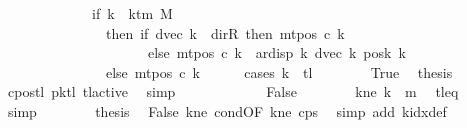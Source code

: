 \begin{isabellebody}
\ \ \ \ \ \ \ \ \ \ \ \ {\isacharequal}{\kern0pt}\ {\isacharparenleft}{\kern0pt}if\ k\ {\isacharless}{\kern0pt}\ k{\isacharunderscore}{\kern0pt}tm\ M\isanewline
\ \ \ \ \ \ \ \ \ \ \ \ \ \ \ then\ {\isacharparenleft}{\kern0pt}if\ dvec\ k\ {\isacharequal}{\kern0pt}\ dir{\isachardot}{\kern0pt}R\ then\ mt{\isacharunderscore}{\kern0pt}pos\ c{}\ k\isanewline
\ \ \ \ \ \ \ \ \ \ \ \ \ \ \ \ \ \ \ \ \ else\ mt{\isacharunderscore}{\kern0pt}pos\ c{}\ k\ {\isacharminus}{\kern0pt}\ ar{\isacharunderscore}{\kern0pt}disp\ {\isacharquery}{\kern0pt}k\ {\isacharparenleft}{\kern0pt}dvec\ k{\isacharparenright}{\kern0pt}\ {\isacharparenleft}{\kern0pt}posk{}\ k{\isacharparenright}{\kern0pt}{\isacharparenright}{\kern0pt}\isanewline
\ \ \ \ \ \ \ \ \ \ \ \ \ \ \ else\ mt{\isacharunderscore}{\kern0pt}pos\ c{}\ k{\isacharparenright}{\kern0pt}{\isachardoublequoteclose}\isanewline
\ \ \ \ \isamarkupfalse%
\ {\isacharparenleft}{\kern0pt}cases\ {\isachardoublequoteopen}k\ {\isacharequal}{\kern0pt}\ {\isacharquery}{\kern0pt}tl{\isachardoublequoteclose}{\isacharparenright}{\kern0pt}\isanewline
\ \ \ \ \ \ \isamarkupfalse%
\ True\ \isamarkupfalse%
\ {\isacharquery}{\kern0pt}thesis\ \isamarkupfalse%
\ c{}{\isacharunderscore}{\kern0pt}pos{\isacharunderscore}{\kern0pt}tl\ pk{\isacharunderscore}{\kern0pt}tl\ tl{\isacharunderscore}{\kern0pt}active\ \isamarkupfalse%
\ simp\isanewline
\ \ \ \ \isamarkupfalse%
\isanewline
\ \ \ \ \ \ \isamarkupfalse%
\ False\isanewline
\ \ \ \ \ \ \isamarkupfalse%
\ kne{\isacharcolon}{\kern0pt}\ {\isachardoublequoteopen}k\ {\isasymnoteq}\ {\isacharquery}{\kern0pt}m{}{\isachardoublequoteclose}\ \isamarkupfalse%
\ tl{\isacharunderscore}{\kern0pt}eq\ \isamarkupfalse%
\ simp\isanewline
\ \ \ \ \ \ \isamarkupfalse%
\ {\isacharquery}{\kern0pt}thesis\ \isamarkupfalse%
\ False\ kne\ cond{\isacharbrackleft}{\kern0pt}OF\ kne{\isacharbrackright}{\kern0pt}\ c{}{\isacharunderscore}{\kern0pt}ps\ \isamarkupfalse%
\ {\isacharparenleft}{\kern0pt}simp\ add{\isacharcolon}{\kern0pt}\ k{\isacharunderscore}{\kern0pt}idx{\isacharunderscore}{\kern0pt}def{\isacharparenright}{\kern0pt}\isanewline
\ \ \ \ \isamarkupfalse%
\isanewline
\ \ \isamarkupfalse%
\isanewline
\ \ \isamarkupfalse%

\end{isabellebody}
